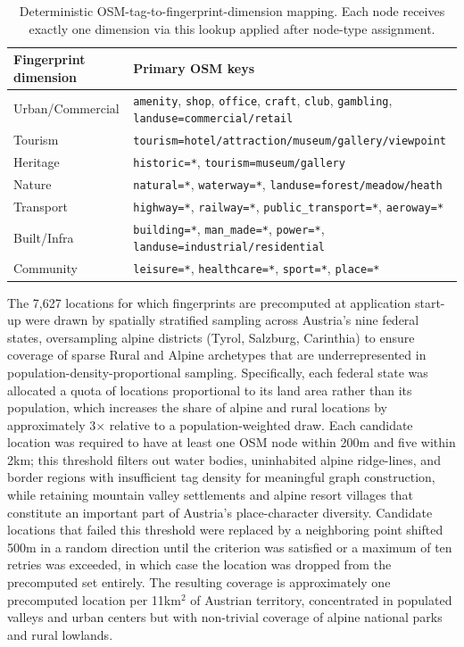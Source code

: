 \documentclass[]{interact}
\theoremstyle{plain}%
\theoremstyle{definition}
\theoremstyle{remark}
\begin{document}
\begin{table}[htbp]
\centering
\begin{tabularx}{\textwidth}{lX}
\toprule
\textbf{Fingerprint dimension} & \textbf{Primary OSM keys} \\
\midrule
Urban/Commercial & \texttt{amenity}, \texttt{shop}, \texttt{office}, \texttt{craft}, \texttt{club}, \texttt{gambling}, \texttt{landuse=commercial/retail} \\
Tourism          & \texttt{tourism=hotel/attraction/museum/gallery/viewpoint} \\
Heritage         & \texttt{historic=*}, \texttt{tourism=museum/gallery} \\
Nature           & \texttt{natural=*}, \texttt{waterway=*}, \texttt{landuse=forest/meadow/heath} \\
Transport        & \texttt{highway=*}, \texttt{railway=*}, \texttt{public\_transport=*}, \texttt{aeroway=*} \\
Built/Infra      & \texttt{building=*}, \texttt{man\_made=*}, \texttt{power=*}, \texttt{landuse=industrial/residential} \\
Community        & \texttt{leisure=*}, \texttt{healthcare=*}, \texttt{sport=*}, \texttt{place=*} \\
\bottomrule
\end{tabularx}
\caption{Deterministic OSM-tag-to-fingerprint-dimension mapping. Each node receives exactly one dimension via this lookup applied after node-type assignment.}
\label{tab:fingerprint}
\end{table}

The 7,627 locations for which fingerprints are precomputed at application start-up were drawn by spatially stratified sampling across Austria's nine federal states, oversampling alpine districts (Tyrol, Salzburg, Carinthia) to ensure coverage of sparse Rural and Alpine archetypes that are underrepresented in population-density-proportional sampling. Specifically, each federal state was allocated a quota of locations proportional to its land area rather than its population, which increases the share of alpine and rural locations by approximately 3$\times$ relative to a population-weighted draw. Each candidate location was required to have at least one OSM node within 200m and five within 2km; this threshold filters out water bodies, uninhabited alpine ridge-lines, and border regions with insufficient tag density for meaningful graph construction, while retaining mountain valley settlements and alpine resort villages that constitute an important part of Austria's place-character diversity. Candidate locations that failed this threshold were replaced by a neighboring point shifted 500m in a random direction until the criterion was satisfied or a maximum of ten retries was exceeded, in which case the location was dropped from the precomputed set entirely. The resulting coverage is approximately one precomputed location per 11km$^2$ of Austrian territory, concentrated in populated valleys and urban centers but with non-trivial coverage of alpine national parks and rural lowlands.
\end{document}
